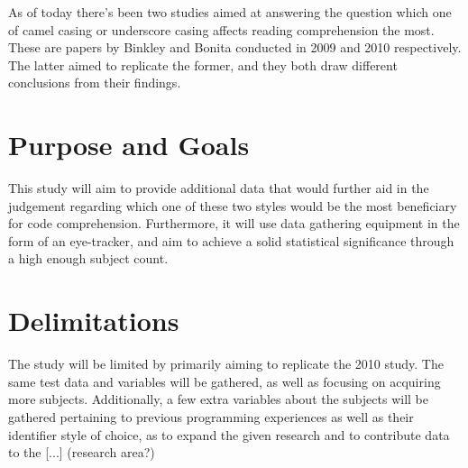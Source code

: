 As of today there's been two studies aimed at answering the question which one of camel casing or underscore casing affects reading comprehension the most. These are papers by Binkley \etal{} \cite{to-camelCase-or-under-score} and Bonita \etal{} \cite{eye-tracking-study} conducted in 2009 and 2010 respectively. The latter aimed to replicate the former, and they both draw different conclusions from their findings.





\section{Purpose and Goals}
\iffalse
\begin{itemize}
	\item Write about the grand scheme of things
	\item Set the correct expectations
	\item What can I expect to learn if I keep on reading?
	\item What are the success criteria for this work?
	\item How will the work be evaluated?
\end{itemize}
\fi

This study will aim to provide additional data that would further aid in the judgement regarding which one of these two styles would be the most beneficiary for code comprehension. Furthermore, it will use data gathering equipment in the form of an eye-tracker, and aim to achieve a solid statistical significance through a high enough subject count.

\section{Delimitations}
\iffalse
\begin{itemize}
	\item Scale down expectations and clarify
\end{itemize}
\fi

The study will be limited by primarily aiming to replicate the 2010 study. The same test data and variables will be gathered, as well as focusing on acquiring more subjects. Additionally, a few extra variables about the subjects will be gathered pertaining to previous programming experiences as well as their identifier style of choice, as to expand the given research and to contribute data to the [...] (research area?)